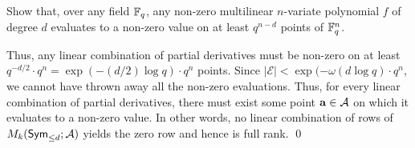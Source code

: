 \begin{exercise}
Show that, over any field $\mathbb{F}_q$, any non-zero multilinear $n$-variate  polynomial $f$ of degree $d$ evaluates to a non-zero value on at least $q^{n-d}$ points of $\mathbb{F}_q^n$. 
\end{exercise}

Thus, any linear combination of partial derivatives must be non-zero on at least $q^{-d/2} \cdot q^n = \exp(-(d/2) \log q) \cdot q^n$ points. Since $|\mathcal{E}| < \exp(-\omega(d \log q) \cdot q^n$, we cannot have thrown away all the non-zero evaluations. Thus, for every linear combination of partial derivatives, there must exist some point $\mathbf{a} \in \mathcal{A}$ on which it evaluates to a non-zero value. In other words, no linear combination of rows of $M_k(\operatorname{\mathsf{Sym}}_{\leq d};\mathcal{A})$ yields the zero row and hence is full rank. \qed


